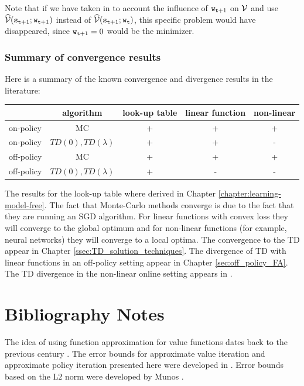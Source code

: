 Note that if we have taken in to account the influence of
${\tt w}_{{\tt t}+1}$ on $\mathcal{V}$ and use
$\widehat{\mathcal{V}}({\tt s}_{{\tt t}+1};{\tt w}_{{\tt t}+1})$ instead of
$\widehat{\mathcal{V}}({\tt s}_{{\tt t}+1};{\tt w}_{\tt t})$, this specific
problem would have disappeared, since ${\tt w}_{{\tt t}+1}=0$ would
be the minimizer.

\subsubsection{Summary of convergence results} Here is a summary of the known convergence and divergence results in
the literature:
\begin{center}
  \begin{tabular}{ | l | c | c|c|c| }
    \hline
    & algorithm & look-up table&linear function&non-linear\\ \hline
    on-policy & MC & + & + & + \\ \hline
    on-policy & $TD(0),TD(\lambda)$ & + & + & -\\ \hline
    off-policy & MC & + & + & + \\ \hline
    off-policy & $TD(0),TD(\lambda)$ & + & - & -\\ \hline
  \end{tabular}
\end{center}

The results for the look-up table where derived in Chapter
\ref{chapter:learning-model-free}.
%
The fact that Monte-Carlo methods converge is due to the fact that
they are running an SGD algorithm. For linear functions with convex
loss they will converge to the global optimum and for non-linear
functions (for example, neural networks) they will converge to a
local optima. The convergence to the TD appear in Chapter
\ref{ssec:TD_solution_techniques}. The divergence of TD with linear functions in
an off-policy setting appear in Chapter \ref{sec:off_policy_FA}. The TD
divergence in the non-linear online setting appears in
\cite{TsitsiklisVR97}.


\section{Bibliography Notes}
The idea of using function approximation for value functions dates back to the previous century \cite{bellman1959functional,shannon1950xxii,barto1983neuronlike,Tesauro02}.
The error bounds for approximate value iteration and approximate policy iteration presented here were developed in \cite{BertsekasTsitsiklis96}. Error bounds based on the L$2$ norm were developed by Munos \citep{munos2007performance}.

